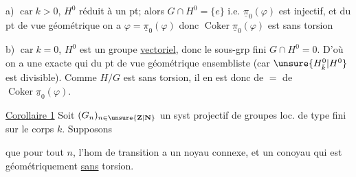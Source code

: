
a) $\operatorname{car}k>0$,   $H^0$  réduit à un pt; alors $G\cap H^0=\{e\}$ i.e. $\underline{\pi}_0(\varphi)$ est injectif, et du pt de vue géométrique  on a $\varphi=\underline{\pi}_0(\varphi)$ donc $\operatorname{Coker}\underline{\pi}_0(\varphi)$ est sans torsion

b) $\operatorname{car}k=0$, $H^0$ est un groupe \uline{vectoriel},  donc le sous-grp fini $G\cap H^0=0$.
D'où  on a une  exacte
qui  du pt de vue géométrique ensembliste (car $\unsure{H^0_{\bar{k}}|H^0}$ est divisible). Comme $H/G$ est sans torsion, il en est donc de $=$ de $\operatorname{Coker}\underline{\pi}_0(\varphi)$.

\uline{Corollaire 1} Soit $(G_n)_{n\in\unsure{\mathbf{Z}|\mathbf{N}}}$ un syst projectif de groupes  loc. de type fini sur le corps $k$. Supposons


 que pour tout $n$, l'hom de transition
 a un noyau connexe, et un conoyau qui est géométriquement \uline{sans} torsion.



